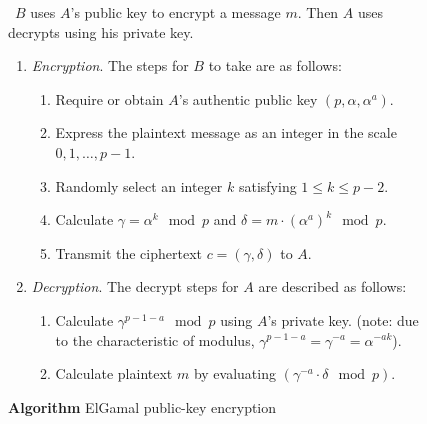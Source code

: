 \documentclass[hyperref=true]{beamer}
\begin{document}
\begin{frame}
\begin{figure}
  \centering
  \begin{algorithmic}
    \ENSURE~$B$ uses $A$'s public key to encrypt a message $m$. Then
    $A$ uses decrypts using his private key.
    \begin{enumerate}
    \item \emph{Encryption}. The steps for $B$ to take are as follows:
      \begin{enumerate}
      \item Require or obtain $A$'s authentic public key
        $(p,\alpha,\alpha^{a})$. 
      \item Express the plaintext message as an integer in the scale
        ${0,1,\ldots,p-1}$. 
      \item Randomly select an integer $k$ satisfying $1\leq k\leq
        p-2$.
      \item Calculate $\gamma=\alpha^{k}\mod p$ and
        $\delta=m\cdot{(\alpha^{a})}^{k}\mod p$.
      \item Transmit the ciphertext $c=(\gamma,\delta)$ to $A$.
      \end{enumerate}
    \item \emph{Decryption}. The decrypt steps for $A$ are described
      as follows:
      \begin{enumerate}
      \item Calculate $\gamma^{p-1-a}\mod p$ using $A$'s private
        key. (note: due to the characteristic of modulus,
        $\gamma^{p-1-a}=\gamma^{-a}=\alpha^{-ak}$). 
      \item Calculate plaintext $m$ by evaluating
        $(\gamma^{-a}\cdot\delta\mod p)$.
      \end{enumerate}
    \end{enumerate}
  \end{algorithmic}
  \caption{\textbf{Algorithm} ElGamal public-key encryption~\cite{ref:Elgamal1985}}
  \label{fig:basic-elgamal-public-key-encry-algo}
\end{figure}
\end{frame}
\end{document}
